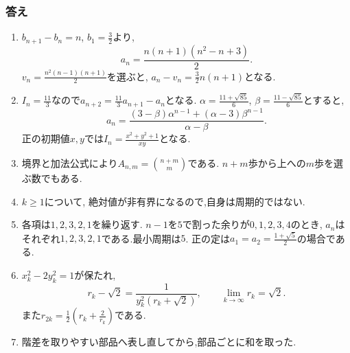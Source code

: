 \subsubsection{答え}
\begin{enumerate}[label=\textbf{問\arabic*.},format=\bookitemlink{practice-connections}{answer}{solution}]
  \item $b_{n+1}-b_n=n$, $b_1=\frac32$より,
    \[
      a_n=\frac{n(n+1)(n^2-n+3)}2.
    \]
    $v_n=\frac{n^2(n-1)(n+1)}2$を選ぶと,
    $a_n-v_n=\frac32n(n+1)$となる.
  \item $I_n=\frac{11}{3}$なので$a_{n+2}=\frac{11}{3}a_{n+1}-a_n$となる.
    $\alpha=\frac{11+\sqrt{85}}{6}$, $\beta=\frac{11-\sqrt{85}}{6}$とすると,
    \[
      a_n=\frac{(3-\beta)\alpha^{n-1}+(\alpha-3)\beta^{n-1}}{\alpha-\beta}.
    \]
    正の初期値$x,y$では$I_n=\frac{x^2+y^2+1}{xy}$となる.
  \item 境界と加法公式により$A_{n,m}=\binom{n+m}{m}$である.
    $n+m$歩から上への$m$歩を選ぶ数でもある.
  \item $k\ge1$について,
    \BookMathLayout{\[
        a_{2k-1}=\frac{1+5(-2)^{k-1}}3,\qquad
        a_{2k}=-\frac{1+5(-2)^{k-1}}3.
      \]}{\[
        \begin{aligned}
          a_{2k-1}&=\frac{1+5(-2)^{k-1}}3,\\
          a_{2k}&=-\frac{1+5(-2)^{k-1}}3.
        \end{aligned}
      \]}
    絶対値が非有界になるので,自身は周期的ではない.
  \item 各項は$1,2,3,2,1$を繰り返す.
    $n-1$を$5$で割った余りが$0,1,2,3,4$のとき,
    $a_n$はそれぞれ$1,2,3,2,1$である.最小周期は$5$.
    正の定は$a_1=a_2=\frac{1+\sqrt5}{2}$の場合である.
  \item $x_k^2-2y_k^2=1$が保たれ,
    \[
      r_k-\sqrt2=\frac1{y_k^2(r_k+\sqrt2)},\qquad
      \lim_{k\to\infty}r_k=\sqrt2.
    \]
    また$r_{2k}=\frac12\left(r_k+\frac{2}{r_k}\right)$である.
  \item
    \BookMathLayout{\[
        \sum_{j=0}^{N-1}j^3
        =6\binom N4+6\binom N3+\binom N2
        =\frac{N^2(N-1)^2}{4}.
      \]}{\[
        \begin{aligned}
          \sum_{j=0}^{N-1}j^3&=6\binom N4+6\binom N3+\binom N2\\
          &=\frac{N^2(N-1)^2}{4}.
        \end{aligned}
      \]}
    階差を取りやすい部品へ表し直してから,部品ごとに和を取った.
\end{enumerate}

